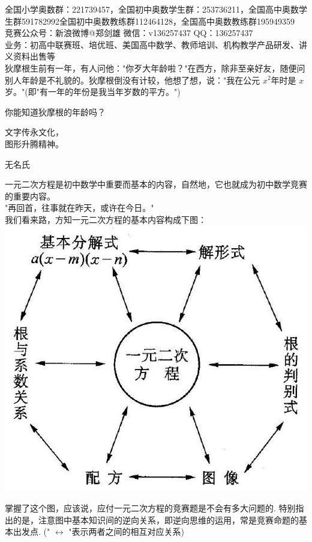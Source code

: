 \documentclass[10pt]{article}
\begin{document}
全国小学奥数群：221739457，全国初中奥数学生群：253736211，全国高中奥数学生群591782992全国初中奥数教练群112464128，全国高中奥数教练群195949359\\
竞赛公众号：新浪微博@郑剑雄 微信：v136257437 QQ：136257437\\
业务：初高中联赛班、培优班、美国高中数学、教师培训、机构教学产品研发、讲义资料出售等\\
狄摩根生前有一年，有人问他："你歹大年龄啦？"在西方，除非至亲好友，随便问别人年龄是不礼貌的。狄摩根倒没有计较，他想了想，说："我在公元 $x^{2}$年时是 $x$ 岁。"(即"有一年的年份是我当年岁数的平方。")

你能知道狄摩根的年龄吗？

文字传永文化，\\
图形升腾精神。

无名氏

一元二次方程是初中数学中重要而基本的内容，自然地，它也就成为初中数学竞赛的重要内容。\\
"再回首，往事就在昨天，或许在今日。"\\
我们看来路，方知一元二次方程的基本内容构成下图：\\
\includegraphics[max width=\textwidth, center]{2024_10_30_26b590fd1106d28139f0g-123(1)}

掌握了这个图，应该说，应付一元二次方程的竞赛题是不会有多大问题的. 特别指出的是，注意图中基本知识间的逆向关系，即逆向思维的运用，常是竞赛命题的基本出发点. (" $\leftrightarrow$ "表示两者之间的相互对应关系)
\end{document}
